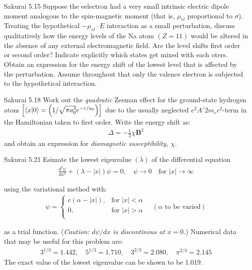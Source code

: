 \documentclass{article}
\newcommand{\bs}{\boldsymbol}
\begin{document}
	\newpage
	\begin{section}{Sakurai 5.15}
		Suppose the eelectron had a very small intrinsic electric dipole moment analogous to the spin-magnetic moment (that is, $\mu_{el}$ proportional to $\sigma$). Treating the hypothetical $-\mu_{el} \cdot E$ interaction as a small perturbation, discuss qualitatively how the energy levels of the Na atom $(Z = 11)$ would be altered in the absence of any external electromagnetic field. Are the level shifts first order or second order? Indicate explicitly which states get mixed with each oters. Obtain an expression for the energy shift of the lowest level that is affected by the perturbation. Assume throughout that only the valence electron is subjected to the hypothetical interaction.
		\begin{tcolorbox}[breakable]
		\end{tcolorbox}
	\end{section}

	\newpage
	\begin{section}{Sakurai 5.18}
		Work out the {\it quadratic} Zeeman effect for the ground-state hydrogen atom $\left[\bra{x}\ket{0} = \left( 1/\sqrt{\pi a_0^3} e^{-r/a_0} \right)\right]$ due to the usually neglected $e^2 A^/2m_ec^2$-term in the Hamiltonian taken to first order. Write the energy shift as:
		\begin{align*}
			\Delta = -\frac{1}{2}\chi\bs{B}^2
		\end{align*}
		and obtain an expression for {\it diamagnetic susceptibility, $\chi$}.
		\begin{tcolorbox}[breakable]
		\end{tcolorbox}
	\end{section}

	\newpage
	\begin{section}{Sakurai 5.21}
		Esimate the lowest eigenvalue $(\lambda)$ of the differential equation
		\begin{align*}
			\frac{d^2 \psi}{dx^2} + (\lambda - |x|)\psi = 0, \quad \psi \to 0 \quad \text{for $|x| \to \infty$}
		\end{align*}

		using the variational method with:
		\begin{align*}
			\psi = \begin{cases}
				c(\alpha - |x|), & \text{for $|x| < \alpha$} \\
				0, & \text{for $|x| > \alpha$} \\
			\end{cases} \quad (\text{$\alpha$ to be varied})
		\end{align*}

		as a trial function. ({\it Caution: $d\psi/dx$ is discontinous at $x = 0$.}) Numerical data that may be useful for this problem are:
		\begin{align*}
			3^{1/3} = 1.442, \quad 5^{1/3} = 1.710, \quad 3^{2/3} = 2.080, \quad \pi^{2/3} = 2.145 
		\end{align*}
		The exact value of the lowest eigenvalue can be shown to be 1.019.
		\begin{tcolorbox}[breakable]
	\end{tcolorbox}
	\end{section}
	
\end{document}
